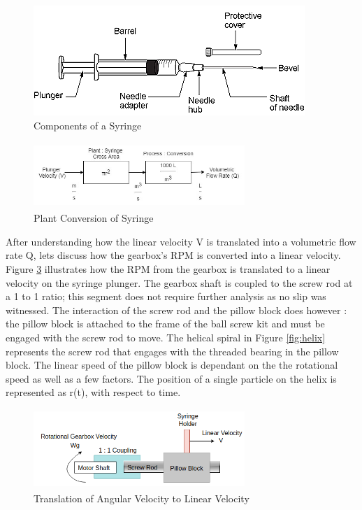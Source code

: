 \documentclass[journal]{IEEEtran}
\begin{document}
                \begin{figure}[H]
                    \centering
                    \includegraphics[scale = 0.55]{syringe}
                    \caption{Components of a Syringe}
                    \label{fig:syringe}
                \end{figure}
                
                \begin{figure}[H]
                    \centering
                    \includegraphics[width= 8cm, height = 2.5cm]{Q_2_V}
                    \caption{Plant Conversion of Syringe}
                    \label{fig:q2v}
                \end{figure}
                
                
               After understanding how the linear velocity V is translated into a volumetric flow rate Q, lets discuss how the gearbox's RPM is converted into a linear velocity. Figure \ref{fig:rot2lin} illustrates how the RPM from the gearbox is translated to a linear velocity on the syringe plunger. The gearbox shaft is coupled to the screw rod at a 1 to 1 ratio; this segment does not require further analysis as no slip was witnessed. The interaction of the screw rod and the pillow block does however : the pillow block is attached to the frame of the ball screw kit and must be engaged with the screw rod to move. The helical spiral in Figure \ref{fig:helix} represents the screw rod that engages with the threaded bearing in the pillow block. The linear speed of the pillow block is dependant on the the rotational speed as well as a few factors. The position of a single particle on the helix is represented as r(t), with respect to time. 
               

               \begin{figure}[h]
                    \centering
                    \includegraphics[width= 8cm, height = 3cm]{rot_2_lin}
                    \caption{Translation of Angular Velocity to Linear Velocity}
                    \label{fig:rot2lin}
                \end{figure}
                
\end{document}
